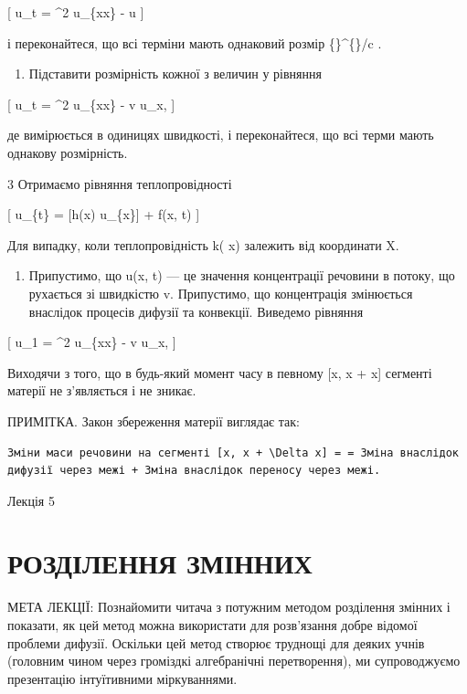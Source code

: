 \documentclass[
  ukrainian,
]{article}
\providecommand{\tightlist}{%
  \setlength{\itemsep}{0pt}\setlength{\parskip}{0pt}}
\begin{document}
{[} u\_t = \alpha\^{}2 u\_\{xx\} - \beta u {]}

і переконайтеся, що всі терміни мають однаковий розмір
\{\}\^{}\{\circ\}/c .

\begin{enumerate}
\def\labelenumi{\arabic{enumi}.}
\setcounter{enumi}{1}
\tightlist
\item
  Підставити розмірність кожної з величин у рівняння
\end{enumerate}

{[} u\_t = \alpha\^{}2 u\_\{xx\} - v u\_x, {]}

де \upsilon вимірюється в одиницях швидкості, і переконайтеся, що всі
терми мають однакову розмірність.

3 Отримаємо рівняння теплопровідності

{[} u\_\{t\} =   {[}h(x)
u\_\{x\}{]} + f(x, t) {]}

Для випадку, коли теплопровідність k\left( x\right) залежить від
координати X.

\begin{enumerate}
\def\labelenumi{\arabic{enumi}.}
\setcounter{enumi}{3}
\tightlist
\item
  Припустимо, що u(x, t) --- це значення концентрації речовини в потоку,
  що рухається зі швидкістю v. Припустимо, що концентрація змінюється
  внаслідок процесів дифузії та конвекції. Виведемо рівняння
\end{enumerate}

{[} u\_1 = \alpha\^{}2 u\_\{xx\} - v u\_x, {]}

Виходячи з того, що в будь-який момент часу в певному {[}x, x +
\Delta x{]} сегменті матерії не з'являється і не зникає.

ПРИМІТКА. Закон збереження матерії виглядає так:

\begin{verbatim}
Зміни маси речовини на сегменті [x, x + \Delta x] = = Зміна внаслідок дифузії через межі + Зміна внаслідок переносу через межі.
\end{verbatim}

Лекція 5

\section{РОЗДІЛЕННЯ
ЗМІННИХ}\label{ux440ux43eux437ux434ux456ux43bux435ux43dux43dux44f-ux437ux43cux456ux43dux43dux438ux445}

МЕТА ЛЕКЦІЇ: Познайомити читача з потужним методом розділення змінних і
показати, як цей метод можна використати для розв'язання добре відомої
проблеми дифузії. Оскільки цей метод створює труднощі для деяких учнів
(головним чином через громіздкі алгебранічні перетворення), ми
супроводжуємо презентацію інтуїтивними міркуваннями.
\end{document}
